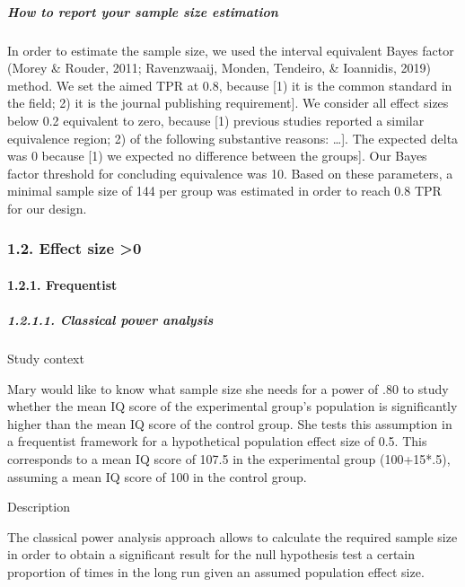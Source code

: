 \documentclass[
  english,
  man,floatsintext]{apa6}
\let\oldparagraph\paragraph
\renewcommand{\paragraph}[1]{\oldparagraph{#1}\mbox{}}
\let\oldsubparagraph\subparagraph
\renewcommand{\subparagraph}[1]{\oldsubparagraph{#1}\mbox{}}
\begin{document}
\hypertarget{how-to-report-your-sample-size-estimation-1}{%
\subparagraph{How to report your sample size estimation}\label{how-to-report-your-sample-size-estimation-1}}

In order to estimate the sample size, we used the interval equivalent Bayes factor (Morey \& Rouder, 2011; Ravenzwaaij, Monden, Tendeiro, \& Ioannidis, 2019) method. We set the aimed TPR at 0.8, because {[}1) it is the common standard in the field; 2) it is the journal publishing requirement{]}. We consider all effect sizes below 0.2 equivalent to zero, because {[}1) previous studies reported a similar equivalence region; 2) of the following substantive reasons: \ldots{]}. The expected delta was 0 because {[}1) we expected no difference between the groups{]}. Our Bayes factor threshold for concluding equivalence was 10. Based on these parameters, a minimal sample size of 144 per group was estimated in order to reach 0.8 TPR for our design.

\hypertarget{effect-size-0-1}{%
\subsubsection{1.2. Effect size \textgreater0}\label{effect-size-0-1}}

\hypertarget{frequentist}{%
\paragraph{1.2.1. Frequentist}\label{frequentist}}

\hypertarget{classical-power-analysis}{%
\subparagraph{1.2.1.1. Classical power analysis}\label{classical-power-analysis}}

Study context

Mary would like to know what sample size she needs for a power of .80 to study whether the mean IQ score of the experimental group's population is significantly higher than the mean IQ score of the control group. She tests this assumption in a frequentist framework for a hypothetical population effect size of 0.5. This corresponds to a mean IQ score of 107.5 in the experimental group (100+15*.5), assuming a mean IQ score of 100 in the control group.

Description

The classical power analysis approach allows to calculate the required sample size in order to obtain a significant result for the null hypothesis test a certain proportion of times in the long run given an assumed population effect size.
\end{document}
